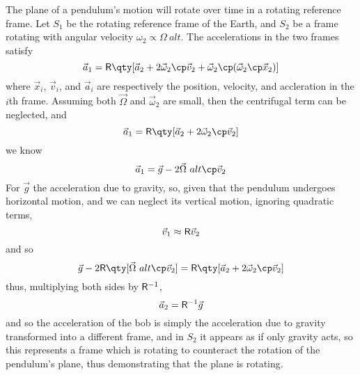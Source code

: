 The plane of a pendulum's motion will rotate over time in a rotating
reference frame. Let $S_1$ be the rotating reference frame of the
Earth, and $S_2$ be a frame rotating with angular velocity $\omega_2
\propto \Omega~{alt}$. The accelerations in the two frames satisfy 
\begin{equation}
  \label{eq:1}
  \vec{a}_1 = \mat{R} \qty[ \vec{a}_2 + 2 \vec{\omega}_2 \cp \vec{v}_2 + \vec{\omega}_2 \cp ( \vec{\omega}_2 \cp \vec{x}_2 )]
\end{equation}
where $\vec{x}_i$, $\vec{v}_i$, and $\vec{a}_i$ are respectively the
position, velocity, and accleration in the $i$th frame. Assuming both
$\vec{\Omega}$ and $\vec{\omega}_2$ are small, then the centrifugal
term can be neglected, and
\[ \vec{a}_1 = \mat{R} \qty[ \vec{a}_2 + 2 \vec{\omega}_2 \cp \vec{v}_2 ] \]
we know
\[ \vec{a}_1 = \vec{g} - 2 \vec{\Omega}~{alt} \cp \vec{v}_2 \] For
$\vec{g}$ the acceleration due to gravity, so, given that the pendulum
undergoes horizontal motion, and we can neglect its vertical motion,
ignoring quadratic terms,
\[ \vec{v}_1 \approx \mathsf{R} \vec{v}_2 \]
and so
\[ \vec{g} - 2 \mat{R} \qty[ \vec{\Omega}~{alt} \cp \vec{v}_2 ] =
\mat{R} \qty[ \vec{a}_2 + 2 \vec{\omega}_2 \cp \vec{v}_2 ] \]
thus, multiplying both sides by $\mathsf{R}^{-1}$,
\begin{equation}
  \label{eq:4}
  \vec{a}_2 = \mathsf{R}^{-1} \vec{g}
\end{equation}
and so the acceleration of the bob is simply the acceleration due to
gravity transformed into a different frame, and in $S_2$ it appears as
if only gravity acts, so this represents a frame which is rotating to
counteract the rotation of the pendulum's plane, thus demonstrating
that the plane is rotating.
